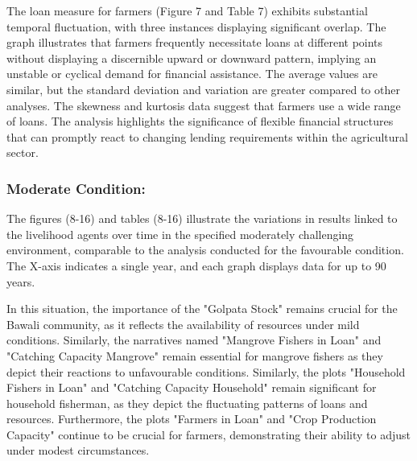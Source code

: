 \documentclass[final,5p,times,twocolumn,authoryear]{elsarticle}
\begin{document}
The loan measure for farmers (Figure 7 and Table 7) exhibits substantial temporal fluctuation, with three instances displaying significant overlap. The graph illustrates that farmers frequently necessitate loans at different points without displaying a discernible upward or downward pattern, implying an unstable or cyclical demand for financial assistance. The average values are similar, but the standard deviation and variation are greater compared to other analyses. The skewness and kurtosis data suggest that farmers use a wide range of loans. The analysis highlights the significance of flexible financial structures that can promptly react to changing lending requirements within the agricultural sector.\\
\FloatBarrier

\subsubsection{Moderate Condition:}
\vspace{0.5cm}
The figures (8-16) and tables (8-16) illustrate the variations in results linked to the livelihood agents over time in the specified moderately challenging environment, comparable to the analysis conducted for the favourable condition. The X-axis indicates a single year, and each graph displays data for up to 90 years.

In this situation, the importance of the "Golpata Stock" remains crucial for the Bawali community, as it reflects the availability of resources under mild conditions. Similarly, the narratives named "Mangrove Fishers in Loan" and "Catching Capacity Mangrove" remain essential for mangrove fishers as they depict their reactions to unfavourable conditions. Similarly, the plots "Household Fishers in Loan" and "Catching Capacity Household" remain significant for household fisherman, as they depict the fluctuating patterns of loans and resources. Furthermore, the plots "Farmers in Loan" and "Crop Production Capacity" continue to be crucial for farmers, demonstrating their ability to adjust under modest circumstances.
\end{document}
